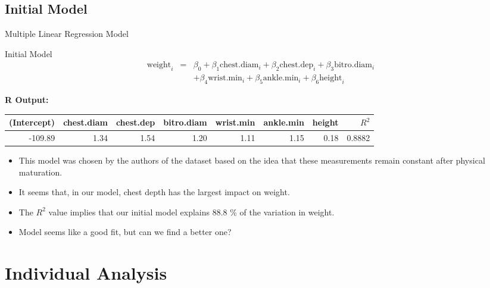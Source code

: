 \documentclass[table]{beamer}\usepackage[]{graphicx}\usepackage[]{color}
\begin{document}

\subsection{Initial Model}


\begin{frame}{Multiple Linear Regression Model}

\begin{block}{Initial Model}
\begin{eqnarray*}
\text{weight}_i &=& \beta_0 + \beta_1 \text{chest.diam}_{i} + \beta_2 \text{chest.dep}_{i} + \beta_3 \text{bitro.diam}_{i} \\
&& + \beta_4 \text{wrist.min}_{i} + \beta_5 \text{ankle.min}_{i} + \beta_6 \text{height}_{i}
\end{eqnarray*}
\end{block}


\textbf{R Output:}\\



{\fontsize{0.275cm}{1em}\selectfont 
\begin{tabular}{|r|r|r|r|r|r|r|r|}
\hline
    (Intercept) & chest.diam & chest.dep & bitro.diam & wrist.min & ankle.min & height & $R^2$ \\ \hline
   -109.89 & 1.34  & 1.54 & 1.20  & 1.11 & 1.15 & 0.18 & 0.8882 \\ \hline
\end{tabular}

\begin{itemize}
  \item This model was chosen by the authors of the dataset based on the idea that these measurements remain constant after physical maturation.
  \item It seems that, in our model, chest depth has the largest impact on weight.
  \item The $R^2$ value implies that our initial model explains 88.8 \% of the variation in weight.
  \item Model seems like a good fit, but can we find a better one?
\end{itemize}

}
\end{frame}



\section{Individual Analysis}
\end{document}
